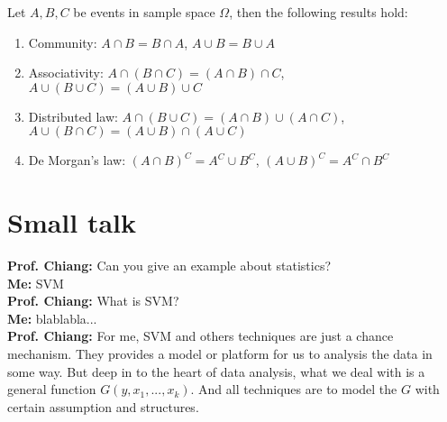 \documentclass[Probability Theory.tex]{subfiles}
\begin{document}
\begin{property}
	Let $A,B,C$ be events in sample space $\Omega$, then the following results hold:
	\begin{enumerate}
		\item Community: $A\cap B=B\cap  A$, $A\cup B=B\cup A$
		\item Associativity: $A\cap(B\cap C) = (A\cap B)\cap C$, $A\cup(B\cup C)=(A\cup B)\cup C$
		\item Distributed law: $A\cap(B\cup C) = (A\cap B)\cup(A\cap C)$, $A\cup(B\cap C)=(A\cup B)\cap(A\cup C)$
		\item De Morgan's law: $(A\cap B)^C = A^C\cup B^C$, $(A\cup B)^C = A^C\cap B^C$
	\end{enumerate}
\end{property}

\section{Small talk}
{\bf Prof. Chiang:} Can you give an example about statistics?\\
{\bf Me:} SVM\\
{\bf Prof. Chiang:} What is SVM?\\
{\bf Me:} blablabla...\\
{\bf Prof. Chiang:} For me, SVM and others techniques are just a chance mechanism. They provides a model or platform for us to analysis the data in some way. But deep in to the heart of data analysis, what we deal with is a general function $G(y,x_1,...,x_k)$. And all techniques are to model the $G$ with certain assumption and structures.


\newpage


\end{document}
